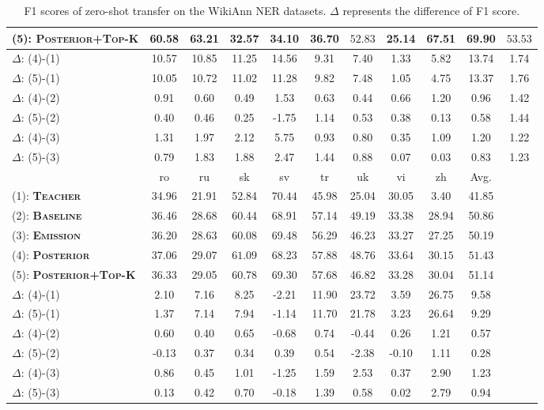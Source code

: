 \documentclass[11pt,a4paper]{article}
\begin{document}
\begin{table*}[t]
\begin{tabular}{l|cccccccccc}
(5): {\bf\textsc{Posterior+Top-K}}  & 60.58 & 63.21 & 32.57 & 34.10 & 36.70 & $\mathbf{52.83}$ & 25.14 & 67.51 & 69.90 & $\mathbf{53.53}$ \\
\hline
$\Delta$: (4)-(1) & 10.57 & 10.85 & 11.25 & 14.56 & 9.31 & 7.40 & 1.33 & 5.82 & 13.74 & 1.74 \\
$\Delta$: (5)-(1) & 10.05 & 10.72 & 11.02 & 11.28 & 9.82 & 7.48 & 1.05 & 4.75 & 13.37 & 1.76 \\
$\Delta$: (4)-(2) & 0.91 & 0.60 & 0.49 & 1.53 & 0.63 & 0.44 & 0.66 & 1.20 & 0.96 & 1.42 \\
$\Delta$: (5)-(2) & 0.40 & 0.46 & 0.25 & -1.75 & 1.14 & 0.53 & 0.38 & 0.13 & 0.58 & 1.44 \\
$\Delta$: (4)-(3) & 1.31 & 1.97 & 2.12 & 5.75 & 0.93 & 0.80 & 0.35 & 1.09 & 1.20 & 1.22 \\
$\Delta$: (5)-(3) & 0.79 & 1.83 & 1.88 & 2.47 & 1.44 & 0.88 & 0.07 & 0.03 & 0.83 & 1.23 \\
 \hline\hline
 & ro & ru & sk & sv & tr & uk & vi & zh & Avg. &  \\
 \hline
(1): {\bf\textsc{Teacher}}  & 34.96 & 21.91 & 52.84 & $\mathbf{70.44}$ & 45.98 & 25.04 & 30.05 & 3.40 & 41.85 &  \\
(2): {\bf\textsc{Baseline}}  & 36.46 & 28.68 & 60.44 & 68.91 & 57.14 & $\mathbf{49.19}$ & 33.38 & 28.94 & 50.86 &  \\
(3): {\bf\textsc{Emission}}  & 36.20 & 28.63 & 60.08 & 69.48 & 56.29 & 46.23 & 33.27 & 27.25 & 50.19 &  \\
(4): {\bf\textsc{Posterior}}  & $\mathbf{37.06}$ & $\mathbf{29.07}$ & $\mathbf{61.09}$ & 68.23 & $\mathbf{57.88}$ & 48.76 & $\mathbf{33.64}$ & $\mathbf{30.15}$ & $\mathbf{51.43}$ &  \\
(5): {\bf\textsc{Posterior+Top-K}}  & 36.33 & 29.05 & 60.78 & 69.30 & 57.68 & 46.82 & 33.28 & 30.04 & 51.14 &  \\
\hline
$\Delta$: (4)-(1) & 2.10 & 7.16 & 8.25 & -2.21 & 11.90 & 23.72 & 3.59 & 26.75 & 9.58 &  \\
$\Delta$: (5)-(1) & 1.37 & 7.14 & 7.94 & -1.14 & 11.70 & 21.78 & 3.23 & 26.64 & 9.29 &  \\
$\Delta$: (4)-(2) & 0.60 & 0.40 & 0.65 & -0.68 & 0.74 & -0.44 & 0.26 & 1.21 & 0.57 &  \\
$\Delta$: (5)-(2) & -0.13 & 0.37 & 0.34 & 0.39 & 0.54 & -2.38 & -0.10 & 1.11 & 0.28 &  \\
$\Delta$: (4)-(3) & 0.86 & 0.45 & 1.01 & -1.25 & 1.59 & 2.53 & 0.37 & 2.90 & 1.23 &  \\
$\Delta$: (5)-(3) & 0.13 & 0.42 & 0.70 & -0.18 & 1.39 & 0.58 & 0.02 & 2.79 & 0.94 & \\
\hline\hline
\end{tabular}
\caption{F1 scores of zero-shot transfer on the WikiAnn NER datasets. $\Delta$ represents the difference of F1 score.}
\label{tab:zs_ner}
\end{table*}
\end{document}
